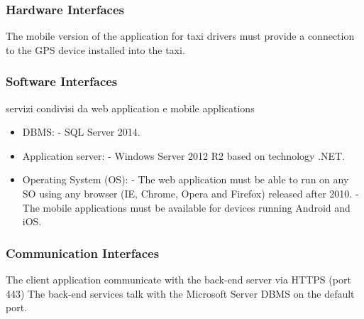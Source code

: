 \subsubsection{Hardware Interfaces}
	The mobile version of the application for taxi drivers must provide a connection to the GPS device installed into the taxi.
	
\subsubsection{Software Interfaces}
	servizi condivisi da web application e mobile applications
	\begin{itemize}
		\item DBMS: \newline
		- SQL Server 2014.
		\item Application server: \newline
		- Windows Server 2012 R2 based on technology .NET.
		\item Operating System (OS): \newline
		- The web application must be able to run on any SO using any browser (IE, Chrome, Opera and Firefox) released after 2010. \newline
		- The mobile applications must be available for devices running Android and iOS.
	\end{itemize}
	
\subsubsection{Communication Interfaces}
	The client application communicate with the back-end server via HTTPS (port 443)
	The back-end services talk with the Microsoft Server DBMS on the default port.